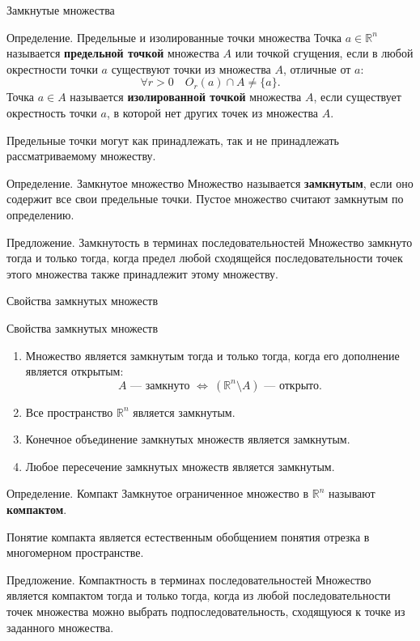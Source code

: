 \documentclass[8pt]{beamer}
\begin{document}
\begin{frame}{Замкнутые множества}
\begin{block}{Определение. Предельные и изолированные точки множества}
Точка $a \in\mathbb{R}^n$ называется {\bf предельной точкой} множества $A$ или точкой сгущения, если в любой окрестности точки $a$ существуют точки из множества $A$, отличные от $a$:
$$\forall r>0\quad O_r(a)\cap A\ne \{a\}.$$
Точка $a\in A$ называется {\bf изолированной точкой} множества $A$, если существует окрестность точки $a$, в которой нет других точек из множества $A$.
\end{block}
Предельные точки могут как принадлежать, так и не принадлежать рассматриваемому множеству.

\begin{block}{Определение. Замкнутое множество}
Множество называется {\bf замкнутым}, если оно содержит все свои предельные точки. Пустое множество считают замкнутым по определению.
\end{block}
\begin{block}{Предложение. Замкнутость в терминах последовательностей}
Множество замкнуто тогда и только тогда, когда предел любой сходящейся последовательности точек этого множества также принадлежит этому множеству.
\end{block}
\end{frame}

\begin{frame}{Свойства замкнутых множеств}
\begin{block}{Свойства замкнутых множеств}
\begin{enumerate}
\item Множество является замкнутым тогда и только тогда, когда его дополнение является открытым:
$$A\text{ --- замкнуто }\iff\ (\mathbb{R}^n\setminus A)\text{ --- открыто.}$$
\item Все пространство $\mathbb{R}^n$ является замкнутым.
\item Конечное объединение замкнутых множеств является замкнутым.
\item Любое пересечение замкнутых множеств является замкнутым.
\end{enumerate}
\end{block}
\begin{block}{Определение. Компакт}
Замкнутое ограниченное множество в $\mathbb{R}^n$ называют {\bf компактом}.
\end{block}
Понятие компакта является естественным обобщением понятия отрезка в многомерном пространстве.
\begin{block}{Предложение. Компактность в терминах последовательностей}
Множество является компактом тогда и только тогда, когда из любой последовательности точек множества можно выбрать подпоследовательность, сходящуюся к точке из заданного множества.
\end{block}
\end{frame}
\end{document}
